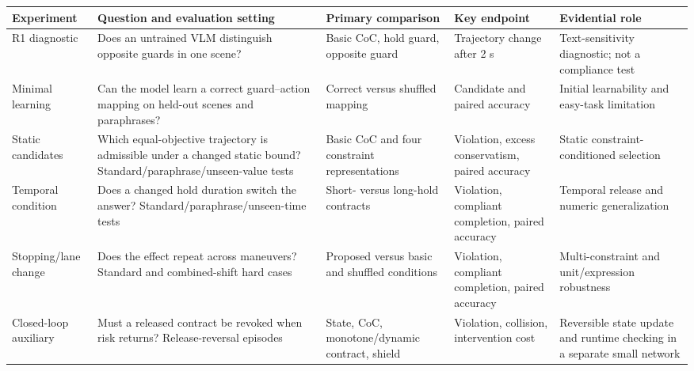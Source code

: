 \begin{table}[!t]
\color{reviewerone}
\centering
{}
\label{tab:suite}
\scriptsize
\begin{tabularx}{\textwidth}{L{0.13\textwidth}L{0.22\textwidth}L{0.19\textwidth}L{0.18\textwidth}Y}
\toprule
Experiment & Question and evaluation setting & Primary comparison & Key endpoint & Evidential role \\
\midrule
R1 diagnostic & Does an untrained VLM distinguish opposite guards in one scene? & Basic CoC, hold guard, opposite guard & Trajectory change after 2 s & Text-sensitivity diagnostic; not a compliance test \\
Minimal learning & Can the model learn a correct guard--action mapping on held-out scenes and paraphrases? & Correct versus shuffled mapping & Candidate and paired accuracy & Initial learnability and easy-task limitation \\
Static candidates & Which equal-objective trajectory is admissible under a changed static bound? Standard/paraphrase/unseen-value tests & Basic CoC and four constraint representations & Violation, excess conservatism, paired accuracy & Static constraint-conditioned selection \\
Temporal condition & Does a changed hold duration switch the answer? Standard/paraphrase/unseen-time tests & Short- versus long-hold contracts & Violation, compliant completion, paired accuracy & Temporal release and numeric generalization \\
Stopping/lane change & Does the effect repeat across maneuvers? Standard and combined-shift hard cases & Proposed versus basic and shuffled conditions & Violation, compliant completion, paired accuracy & Multi-constraint and unit/expression robustness \\
Closed-loop auxiliary & Must a released contract be revoked when risk returns? Release-reversal episodes & State, CoC, monotone/dynamic contract, shield & Violation, collision, intervention cost & Reversible state update and runtime checking in a separate small network \\
\bottomrule
\end{tabularx}
\end{table}

